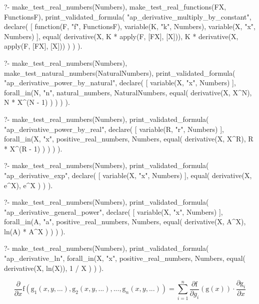 \begin{prolog}
?-	make_test_real_numbers(Numbers),
	make_test_real_functions(FX, FunctionsF),
	print_validated_formula(
		"ap_derivative_multiply_by_constant",
		declare(
			[
				function(F, "f", FunctionsF),
				variable(K, "k", Numbers),
				variable(X, "x", Numbers)
			],
			equal(
				derivative(X, K * apply(F, [FX], [X])),
				K * derivative(X, apply(F, [FX], [X]))
			)
		)
	).
\end{prolog}

\begin{prolog}
?-	make_test_real_numbers(Numbers),
	make_test_natural_numbers(NaturalNumbers),
	print_validated_formula(
		"ap_derivative_power_by_natural",
		declare(
			[
				variable(X, "x", Numbers)
			],
			forall_in(N, "n", natural_numbers, NaturalNumbers, 
				equal(
					derivative(X, X^N),
					N * X^(N - 1)
				)
			)
		)
	).
\end{prolog}

\begin{prolog}
?-	make_test_real_numbers(Numbers),
	print_validated_formula(
		"ap_derivative_power_by_real",
		declare(
			[
				variable(R, "r", Numbers)
			],
			forall_in(X, "x", positive_real_numbers, Numbers, 
				equal(
					derivative(X, X^R),
					R * X^(R - 1)
				)
			)
		)
	).
\end{prolog}

\begin{prolog}
?-	make_test_real_numbers(Numbers),
	print_validated_formula(
		"ap_derivative_exp",
		declare(
			[
				variable(X, "x", Numbers)
			],
			equal(
				derivative(X, e^X),
				e^X
			)
		)
	).
\end{prolog}

\begin{prolog}
?-	make_test_real_numbers(Numbers),
	print_validated_formula(
		"ap_derivative_general_power",
		declare(
			[
				variable(X, "x", Numbers)
			],
			forall_in(A, "a", positive_real_numbers, Numbers, 
				equal(
					derivative(X, A^X),
					ln(A) * A^X
				)
			)
		)
	).
\end{prolog}

\begin{prolog}
?-	make_test_real_numbers(Numbers),
	print_validated_formula(
		"ap_derivative_ln",
		forall_in(X, "x", positive_real_numbers, Numbers, 
			equal(
				derivative(X, ln(X)),
				1 / X
			)
		)
	).
\end{prolog}

\begin{equation}
\frac{\partial}{\partial x} \mathrm{f} (\mathrm{g}_1(x, y, ...), \mathrm{g}_2(x, y, ...), ..., \mathrm{g}_n(x, y, ...)) = \sum_{i=1}^n \frac{\partial \mathrm{f}}{\partial g_i}(\mathrm{g}(x)) \cdot \frac{\partial \mathrm{g}_i}{\partial x}
\end{equation}
